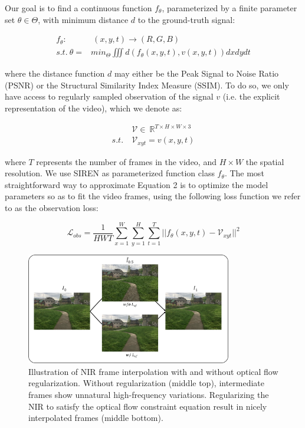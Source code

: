 \documentclass{article}
\begin{document}
Our goal is to find a continuous function $f_{\theta}$, parameterized by a finite parameter set $\theta \in \Theta$,
with minimum distance $d$ to the ground-truth signal:

\begin{equation}
\begin{aligned}
f_{\theta}:& \:(x, y, t) \rightarrow (R, G, B) \\
s.t. \: \theta =& min_{\Theta} \iiint d(f_{\theta}(x,y,t), v(x,y,t)) dx dy dt
\end{aligned}
\end{equation}

where the distance function $d$ may either be the Peak Signal to Noise Ratio (PSNR) or the Structural Similarity Index Measure (SSIM).
To do so, we only have access to regularly sampled observation of the signal $v$
(i.e. the explicit representation of the video), which we denote as:

\begin{equation}
\begin{aligned}
&\mathcal{V} \in  \: \mathbb{R}^{T \times H \times W \times 3} \\
s.t. \: &\mathcal{V}_{xyt} =   v(x, y, t) %
\end{aligned}
\end{equation}

where $T$ represents the number of frames in the video, and $H \times W$ the spatial resolution.
We use SIREN as parameterized function class $f_{\theta}$.
The most straightforward way to approximate Equation 2 is to optimize the model parameters so as to fit the video frames,
using the following loss function we refer to as the observation loss:

\begin{equation}
\mathcal{L}_{obs} = \frac{1}{HWT} \sum_{x=1}^W\sum_{y=1}^H\sum_{t=1}^T || f_{\theta}(x,y,t) - \mathcal{V}_{xyt} ||^2
\end{equation}

\begin{figure}[t]
\centering
\includegraphics[width=0.8\textwidth]{"w_wo_OF"}
\caption{Illustration of NIR frame interpolation with and without optical flow regularization.
Without regularization (middle top), intermediate frames show unnatural high-frequency variations.
Regularizing the NIR to satisfy the optical flow constraint equation result in nicely interpolated frames (middle bottom).
}
\label{fig_w_wo_OF}
\end{figure}
\end{document}
